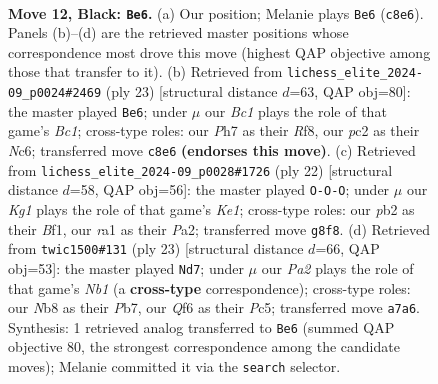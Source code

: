 \documentclass[11pt]{article}
\begin{document}
\begin{figure}[p]
\label{fig:thought-m21}
\end{figure}

\clearpage

\begin{figure}[p]\centering
\begin{subfigure}{0.46\textwidth}\centering
\resizebox{\linewidth}{!}{%
\newchessgame
\chessboard[
  setfen={rnb1r1k1/pp3ppp/3b1q2/3p4/3p4/N2B1N2/PPP2PPP/R2Q1RK1 b - - 1 12},
  showmover=false,
  pgfstyle=straightmove, color=movearrow, markmove={c8-e6}
]}
\caption{}
\end{subfigure}\hfill
\begin{subfigure}{0.46\textwidth}\centering
\resizebox{\linewidth}{!}{%
\newchessgame
\chessboard[
  setfen={r1b2rk1/pp3pp1/2n2q1p/2bp4/8/2NBPN2/PP3PPP/R2Q1RK1 b - - 1 12},
  showmover=false,
  pgfstyle=straightmove, color=movearrow, markmove={c8-e6}
]}
\caption{}
\end{subfigure}
\\[4pt]
\begin{subfigure}{0.46\textwidth}\centering
\resizebox{\linewidth}{!}{%
\newchessgame
\chessboard[
  setfen={2kr3r/pp2qppp/2npbn2/2p5/2P1PB2/2Q2P2/PP2N1PP/R3KB1R w KQ - 6 12},
  showmover=false,
  pgfstyle=straightmove, color=movearrow, markmove={e1-c1}
]}
\caption{}
\end{subfigure}\hfill
\begin{subfigure}{0.46\textwidth}\centering
\resizebox{\linewidth}{!}{%
\newchessgame
\chessboard[
  setfen={rn3rk1/pp3pp1/4bq1p/2pp4/3P4/P1PBPN2/5PPP/R2Q1RK1 b - - 0 12},
  showmover=false,
  pgfstyle=straightmove, color=movearrow, markmove={b8-d7}
]}
\caption{}
\end{subfigure}
\caption{\textbf{Move 12, Black: \texttt{Be6}.} (a) Our position; Melanie plays \texttt{Be6} (\texttt{c8e6}). Panels (b)--(d) are the retrieved master positions whose correspondence most drove this move (highest QAP objective among those that transfer to it). (b) Retrieved from \texttt{lichess\_elite\_2024-09\_p0024\#2469} (ply 23) [structural distance $d$=63, QAP obj=80]: the master played \texttt{Be6}; under $\mu$ our \emph{Bc1} plays the role of that game's \emph{Bc1}; cross-type roles: our \emph{P}h7 as their \emph{R}f8, our \emph{p}c2 as their \emph{N}c6; transferred move \texttt{c8e6} \textbf{(endorses this move)}. (c) Retrieved from \texttt{lichess\_elite\_2024-09\_p0028\#1726} (ply 22) [structural distance $d$=58, QAP obj=56]: the master played \texttt{O-O-O}; under $\mu$ our \emph{Kg1} plays the role of that game's \emph{Ke1}; cross-type roles: our \emph{p}b2 as their \emph{B}f1, our \emph{r}a1 as their \emph{P}a2; transferred move \texttt{g8f8}. (d) Retrieved from \texttt{twic1500\#131} (ply 23) [structural distance $d$=66, QAP obj=53]: the master played \texttt{Nd7}; under $\mu$ our \emph{Pa2} plays the role of that game's \emph{Nb1} (a \textbf{cross-type} correspondence); cross-type roles: our \emph{N}b8 as their \emph{P}b7, our \emph{Q}f6 as their \emph{P}c5; transferred move \texttt{a7a6}. Synthesis: 1 retrieved analog transferred to \texttt{Be6} (summed QAP objective 80, the strongest correspondence among the candidate moves); Melanie committed it via the \texttt{search} selector.}

\end{figure}
\end{document}
